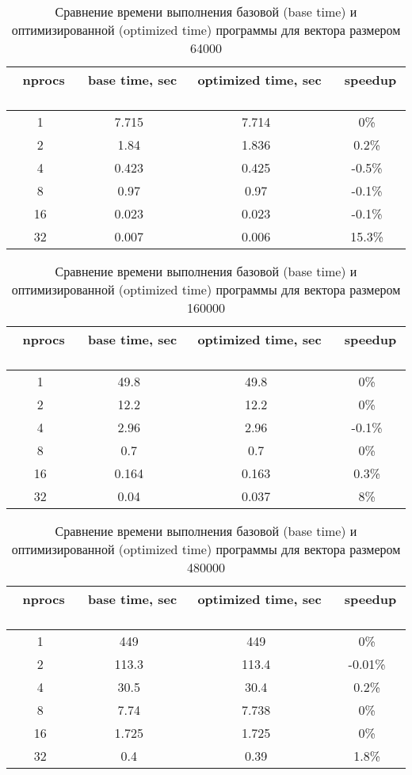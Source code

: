 \documentclass[12pt, oneside, a4paper]{article}
\begin{document}
\begin{table}[]
\caption{Сравнение времени выполнения базовой (base time) и оптимизированной (optimized time) программы для вектора размером 64000}
\label{tab:results1}
\centering
\begin{tabular}{ | c | c | c | c |}
\hline
	\, nprocs \, & \, base time, sec \, & \, optimized time, sec \, & \, speedup \, \\
\hline
	1 & 7.715 & 7.714 & 0\% \\
	2 & 1.84 & 1.836 & 0.2\% \\
	4 & 0.423 & 0.425 & -0.5\% \\
	8 & 0.97 & 0.97 & -0.1\% \\
	16 & 0.023 & 0.023 & -0.1\% \\
	32 & 0.007 & 0.006 & 15.3\% \\
\hline
\end{tabular}
\end{table}

\begin{table}[]
\caption{Сравнение времени выполнения базовой (base time) и оптимизированной (optimized time) программы для вектора размером 160000}
\label{tab:results1}
\centering
\begin{tabular}{ | c | c | c | c |}
\hline
	\, nprocs \, & \, base time, sec \, & \, optimized time, sec \, & \, speedup \, \\
\hline
	1 & 49.8 & 49.8 & 0\% \\
	2 & 12.2 & 12.2 & 0\% \\
	4 & 2.96 & 2.96 & -0.1\% \\
	8 & 0.7 & 0.7 & 0\% \\
	16 & 0.164 & 0.163 & 0.3\% \\
	32 & 0.04 & 0.037 & 8\% \\
\hline
\end{tabular}
\end{table}

\begin{table}[]
\caption{Сравнение времени выполнения базовой (base time) и оптимизированной (optimized time) программы для вектора размером 480000}
\label{tab:results1}
\centering
\begin{tabular}{ | c | c | c | c |}
\hline
	\, nprocs \, & \, base time, sec \, & \, optimized time, sec \, & \, speedup \, \\
\hline
	1 & 449 & 449 & 0\% \\
	2 & 113.3 & 113.4 & -0.01\% \\
	4 & 30.5 & 30.4 & 0.2\% \\
	8 & 7.74 & 7.738 & 0\% \\
	16 & 1.725 & 1.725 & 0\% \\
	32 & 0.4 & 0.39 & 1.8\% \\
\hline
\end{tabular}
\end{table}
\end{document}
